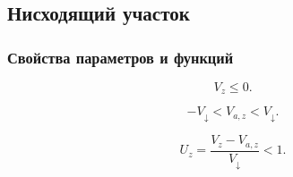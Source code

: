 \subsection{Нисходящий участок}

\subsubsection{Свойства параметров и функций}

$$V_z \leq 0.$$

$$-V_\downarrow < V_{a,z} < V_\downarrow. $$

$$U_z = \frac{V_z - V_{a,z}}{V_\downarrow} < 1.$$



